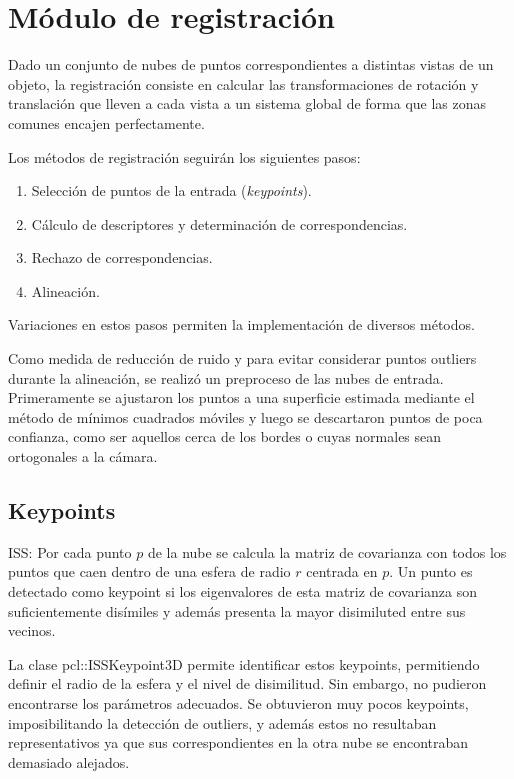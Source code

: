 \chapter{Módulo de registración}
	Dado un conjunto de nubes de puntos correspondientes a distintas vistas de
	un objeto, la registración consiste en calcular las transformaciones de
	rotación y translación que lleven a cada vista a un sistema global de forma
	que las zonas comunes encajen perfectamente.

	Los métodos de registración seguirán los siguientes pasos:
	\begin{enumerate}
		\item Selección de puntos de la entrada (\emph{keypoints}).
		\item Cálculo de descriptores y determinación de correspondencias.
		\item Rechazo de correspondencias.
		\item Alineación.
	\end{enumerate}
	Variaciones en estos pasos permiten la implementación de diversos métodos.

	Como medida de reducción de ruido y para evitar considerar puntos outliers
	durante la alineación, se realizó un preproceso de las nubes de entrada.
	Primeramente se ajustaron los puntos a una superficie estimada mediante el
	método de mínimos cuadrados móviles y luego se descartaron puntos de poca
	confianza, como ser aquellos cerca de los bordes o cuyas normales sean
	ortogonales a la cámara.

	\section{Keypoints}
		ISS:
		Por cada punto $p$ de la nube se calcula la matriz de covarianza con
		todos los puntos que caen dentro de una esfera de radio $r$ centrada en
		$p$.
		Un punto es detectado como keypoint si los eigenvalores de esta matriz
		de covarianza son suficientemente disímiles y además presenta la mayor disimiluted entre sus vecinos.

		La clase pcl::ISSKeypoint3D permite identificar estos keypoints, permitiendo definir el radio de la esfera y el nivel de disimilitud.
		Sin embargo, no pudieron encontrarse los parámetros adecuados.
		Se obtuvieron muy pocos keypoints, imposibilitando la detección de outliers,
		y además estos no resultaban representativos ya que sus correspondientes en la otra nube se encontraban demasiado alejados.

